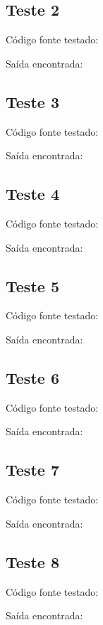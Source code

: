 \documentclass[11pt]{article}
\begin{document}
	
	\subsection{Teste 2}
		
		Código fonte testado:
		
			
		Saída encontrada:
		


	\subsection{Teste 3}
	
		Código fonte testado:
		
			
		Saída encontrada:
		


	\subsection{Teste 4}
	
		Código fonte testado:
		
			
		Saída encontrada:
		
		
	
	\subsection{Teste 5}
	
		Código fonte testado:
		
			
		Saída encontrada:
		


	\subsection{Teste 6}
	
		Código fonte testado:
		
			
		Saída encontrada:
		


	\subsection{Teste 7}
	
		Código fonte testado:
		
			
		Saída encontrada:
		


	\subsection{Teste 8}
	
		Código fonte testado:
		
		
		Saída encontrada:
		
\end{document}
